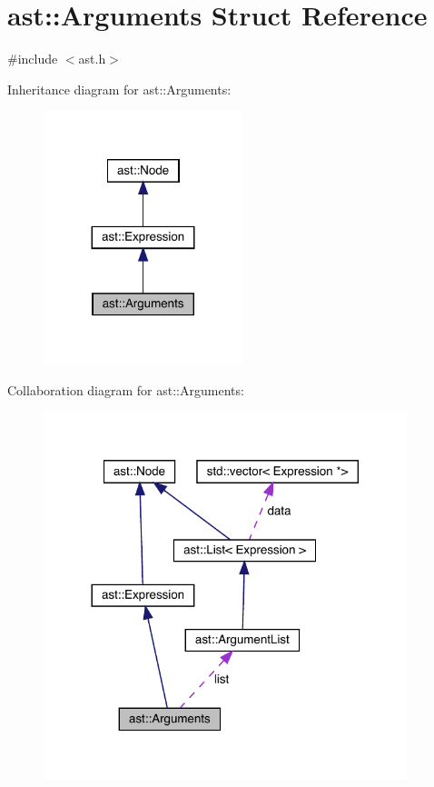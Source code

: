 \hypertarget{structast_1_1_arguments}{}\section{ast\+:\+:Arguments Struct Reference}
\label{structast_1_1_arguments}


{\ttfamily \#include $<$ast.\+h$>$}



Inheritance diagram for ast\+:\+:Arguments\+:
\nopagebreak
\begin{figure}[H]
\begin{center}
\leavevmode
\includegraphics[width=164pt]{structast_1_1_arguments__inherit__graph}
\end{center}
\end{figure}


Collaboration diagram for ast\+:\+:Arguments\+:
\nopagebreak
\begin{figure}[H]
\begin{center}
\leavevmode
\includegraphics[width=300pt]{structast_1_1_arguments__coll__graph}
\end{center}
\end{figure}
